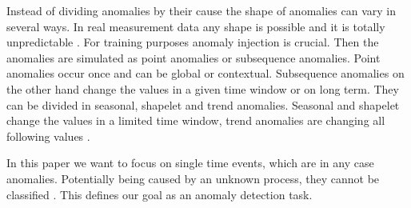 Instead of dividing anomalies by their cause the shape of anomalies can vary in several ways. In real measurement data any shape is possible and it is totally unpredictable \cite{schwartz_maeday_2024}. For training purposes anomaly injection is crucial. Then the anomalies are simulated as point anomalies or subsequence anomalies. Point anomalies occur once and can be global or contextual. Subsequence anomalies on the other hand change the values in a given time window or on long term. They can be divided in seasonal, shapelet and trend anomalies. Seasonal and shapelet change the values in a limited time window, trend anomalies are changing all following values \cite[p. 9]{darban_carla_2024}. %

In this paper we want to focus on single time events, which are in any case anomalies. Potentially being caused by an unknown process, they cannot be classified \cite{gruhl_novelty_2022}. This defines our goal as an anomaly detection task.

